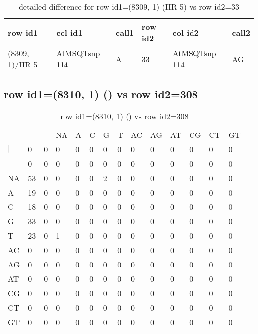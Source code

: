 \begin{center}
\begin{longtable}{|l|l|l|l|l|l|}
\caption{detailed difference for row id1=(8309, 1) (HR-5) vs row id2=33} \label{table_dm493}\\
\hline
row id1&col id1&call1&row id2&col id2&call2\\
\hline
(8309, 1)/HR-5&AtMSQTsnp 114&A&33&AtMSQTsnp 114&AG\\
\hline
\end{longtable}
\end{center}

\subsection{row id1=(8310, 1) () vs row id2=308}
\begin{center}
\begin{longtable}{|l|l|l|l|l|l|l|l|l|l|l|l|l|l|}
\caption{row id1=(8310, 1) () vs row id2=308} \label{table_dm494}\\
\hline
\\
\hline
&$|$&-&NA&A&C&G&T&AC&AG&AT&CG&CT&GT\\
$|$&0&0&0&0&0&0&0&0&0&0&0&0&0\\
-&0&0&0&0&0&0&0&0&0&0&0&0&0\\
NA&53&0&0&0&0&2&0&0&0&0&0&0&0\\
A&19&0&0&0&0&0&0&0&0&0&0&0&0\\
C&18&0&0&0&0&0&0&0&0&0&0&0&0\\
G&33&0&0&0&0&0&0&0&0&0&0&0&0\\
T&23&0&1&0&0&0&0&0&0&0&0&0&0\\
AC&0&0&0&0&0&0&0&0&0&0&0&0&0\\
AG&0&0&0&0&0&0&0&0&0&0&0&0&0\\
AT&0&0&0&0&0&0&0&0&0&0&0&0&0\\
CG&0&0&0&0&0&0&0&0&0&0&0&0&0\\
CT&0&0&0&0&0&0&0&0&0&0&0&0&0\\
GT&0&0&0&0&0&0&0&0&0&0&0&0&0\\
\hline
\end{longtable}
\end{center}

